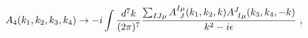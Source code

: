 \begin{equation} \label{unit}
A_4 (k_1,k_2,k_3,k_4) \rightarrow - i \int {d^7 k\over (2\pi)^7}
{\sum_{IJ\mu}A^{I \mu }_{\ J} (k_1,k_2, k) A^{J}_{\ I \mu } (k_3,
k_4, -k) \over k^2 - i\epsilon} \ ,
\end{equation}

